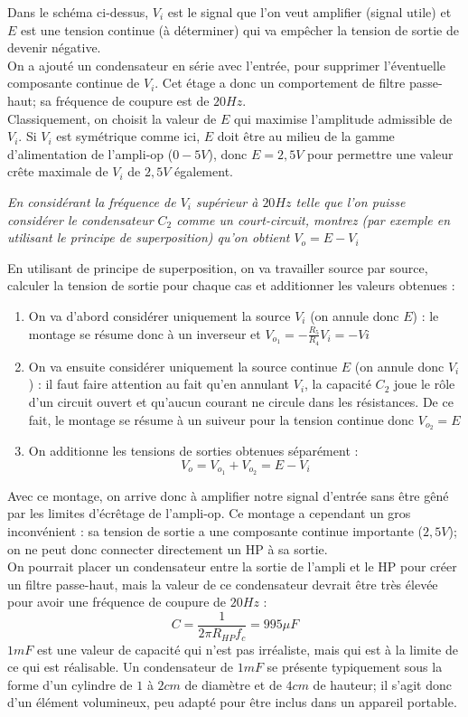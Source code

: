 Dans le schéma ci-dessus, $V_i$ est le signal que l'on veut amplifier (signal utile) et $E$ est une tension continue (à déterminer) qui va empêcher la tension de sortie de devenir négative.\\
On a ajouté un condensateur en série avec l'entrée, pour supprimer l'éventuelle composante continue de $V_i$. Cet étage a donc un comportement de filtre passe-haut; sa fréquence de coupure est de $20Hz$.\\
Classiquement, on choisit la valeur de $E$ qui maximise l'amplitude admissible de $V_i$. Si $V_i$ est symétrique comme ici, $E$ doit être au milieu de la gamme d'alimentation de l'ampli-op ($0-5V$), donc $E = 2,5V$ pour permettre une valeur crête maximale de $V_i$ de $2,5V$ également.

{
\textit{En considérant la fréquence de $V_i$ supérieur à $20Hz$ telle que l'on puisse considérer le condensateur $C_2$ comme un court-circuit, montrez (par exemple en utilisant le principe de superposition) qu'on obtient $V_o = E - V_i$}
}
{%
En utilisant de principe de superposition, on va travailler source par source, calculer la tension de sortie pour chaque cas et additionner les valeurs obtenues :
\begin{enumerate}
\item On va d'abord considérer uniquement la source $V_i$ (on annule donc $E$) : le montage se résume donc à un inverseur et $V_{o_1} = -\frac{R_5}{R_4}V_i = -Vi$
\item On va ensuite considérer uniquement la source continue $E$ (on annule donc $V_i$) : il faut faire attention au fait qu'en annulant $V_i$, la capacité $C_2$ joue le rôle d'un circuit ouvert et qu'aucun courant ne circule dans les résistances. De ce fait, le montage se résume à un suiveur pour la tension continue donc $V_{o_2} = E$
\item On additionne les tensions de sorties obtenues séparément :
$$V_o = V_{o_1} + V_{o_2} = E - V_i$$
\end{enumerate}
}

Avec ce montage, on arrive donc à amplifier notre signal d'entrée sans être gêné par les limites d'écrêtage de l'ampli-op. Ce montage a cependant un gros inconvénient : sa tension de sortie a une composante continue importante ($2,5V$); on ne peut donc connecter directement un HP à sa sortie.\\
On pourrait placer un condensateur entre la sortie de l'ampli et le HP pour créer un filtre passe-haut, mais la valeur de ce condensateur devrait être très élevée pour avoir une fréquence de coupure de $20Hz$ :
$$C=\frac{1}{2 \pi R_{HP} f_c}=995\mu F$$
$1mF$ est une valeur de capacité qui n'est pas irréaliste, mais qui est à la limite de ce qui est réalisable. Un condensateur de $1mF$ se présente typiquement sous la forme d'un cylindre de $1$ à $2cm$ de diamètre et de $4cm$ de hauteur; il s'agit donc d'un élément volumineux, peu adapté pour être inclus dans un appareil portable.
\newpage

